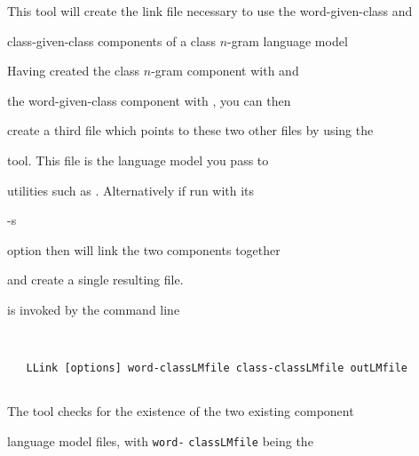 %






%





\newpage














This tool will create the link file necessary to use the word-given-class and


class-given-class components of a class $n$-gram language model





Having created the class $n$-gram component with  and


the word-given-class component with , you can then


create a third file which points to these two other files by using the


 tool.  This file is the language model you pass to


utilities such as .  Alternatively if run with its {\tt


-s} option then  will link the two components together


and create a single resulting file.













 is invoked by the command line


\begin{verbatim}


   LLink [options] word-classLMfile class-classLMfile outLMfile


\end{verbatim}


The tool checks for the existence of the two existing component


language model files, with {\tt word-} {\tt classLMfile} being the


